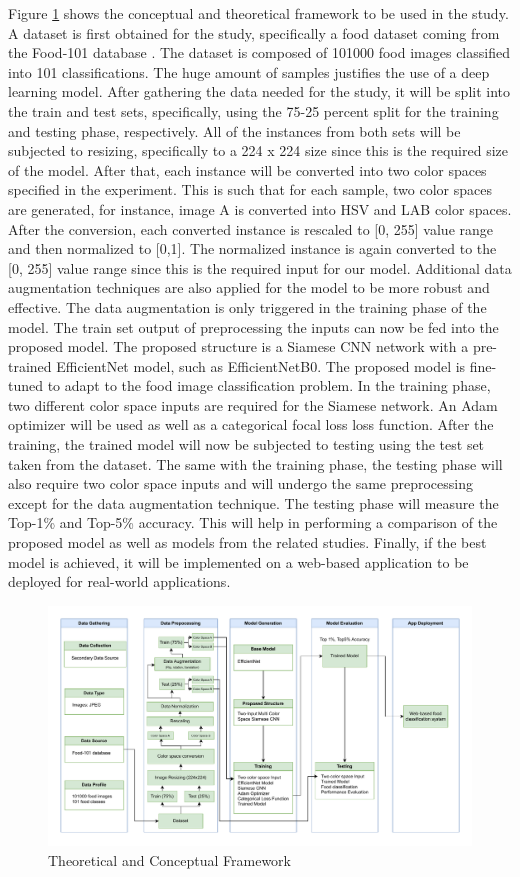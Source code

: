 Figure \ref{fig:scnn-fc} shows the conceptual and theoretical framework to be used in the study. A dataset is first obtained for the study, specifically a food dataset coming from the Food-101 database \cite{bossard-2014}. The dataset is composed of 101000 food images classified into 101 classifications. The huge amount of samples justifies the use of a deep learning model. After gathering the data needed for the study, it will be split into the train and test sets, specifically, using the 75-25 percent split for the training and testing phase, respectively. All of the instances from both sets will be subjected to resizing, specifically to a 224 x 224 size since this is the required size of the model. After that, each instance will be converted into two color spaces specified in the experiment. This is such that for each sample, two color spaces are generated, for instance, image A is converted into HSV and LAB color spaces. After the conversion, each converted instance is rescaled to [0, 255] value range and then normalized to [0,1]. The normalized instance is again converted to the [0, 255] value range since this is the required input for our model. Additional data augmentation techniques are also applied for the model to be more robust and effective. The data augmentation is only triggered in the training phase of the model. The train set output of preprocessing the inputs can now be fed into the proposed model. The proposed structure is a Siamese CNN network with a pre-trained EfficientNet model, such as EfficientNetB0. The proposed model is fine-tuned to adapt to the food image classification problem. In the training phase, two different color space inputs are required for the Siamese network. An Adam optimizer will be used as well as a categorical focal loss loss function. After the training, the trained model will now be subjected to testing using the test set taken from the dataset. The same with the training phase, the testing phase will also require two color space inputs and will undergo the same preprocessing except for the data augmentation technique. The testing phase will measure the Top-1\% and Top-5\% accuracy. This will help in performing a comparison of the proposed model as well as models from the related studies. Finally, if the best model is achieved, it will be implemented on a web-based application to be deployed for real-world applications.
\begin{figure}[h]
 	\centering
	\includegraphics[width=1.15\textwidth]{graphics/images/scnn-fc-concept.pdf}
	\caption{Theoretical and Conceptual Framework}
	\label{fig:scnn-fc}
\end{figure}